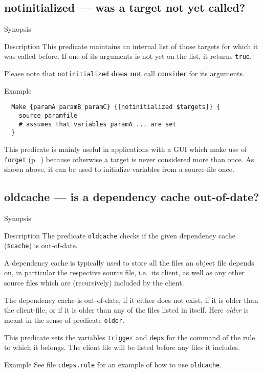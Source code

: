 \documentclass[11pt,bibtotoc,idxtotoc]{scrreprt}
\begin{document}
\subsection{notinitialized --- was a target not yet called?}
\label{pred:notinitialized}
\begin{Describe}
\item[Synopsis]  
\item[Description] This predicate maintains an internal list of those
  targets for which it was called before. If one of its arguments is
  not yet on the list, it returns \texttt{true}.
  
  Please note that \texttt{notinitialized} \textbf{does not} call
  \texttt{consider} for its arguments.
\item[Example]
\begin{verbatim}
  Make {paramA paramB paramC} {[notinitialized $targets]} {
    source paramfile    
    # assumes that variables paramA ... are set 
  }
\end{verbatim} 
  This predicate is mainly useful in applications with a GUI which
  make use of \texttt{forget} (p.~\pageref{proc:forget}) because
  otherwise a target is never considered more than once. As shown
  above, it can be used to initialize variables from a source-file once.
\end{Describe}

\subsection{oldcache --- is a dependency cache out-of-date?}
\label{pred:oldcache}
\begin{Describe}
\item[Synopsis]  
\item[Description] The predicate \texttt{oldcache} checks if the given
  dependency cache (\texttt{\$cache}) is out-of-date. 
  
  A dependency cache is typically used to store all the files an
  object file depends on, in particular the respective source file,
  i.e.\ its client, as well as any other source files which are
  (recursively) included by the client.
  
  The dependency cache is out-of-date, if it either does not exist, if
  it is older than the client-file, or if it is older than any of the
  files listed in itself. Here \textit{older} is meant in the sense of 
  predicate \texttt{older}. 

  This predicate sets the variables \texttt{trigger} and
  \texttt{deps} for the command of the rule to which it belongs. The
  client file will be listed before any files it includes.
\item[Example] See file \texttt{cdeps.rule} for an example of how to use 
  \texttt{oldcache}.
\end{Describe}
\end{document}
